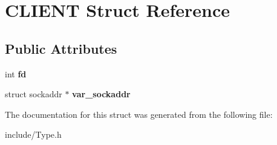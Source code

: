 \hypertarget{structCLIENT}{}\section{C\+L\+I\+E\+N\+T Struct Reference}
\label{structCLIENT}
\subsection*{Public Attributes}
\begin{DoxyCompactItemize}
\item 
\hypertarget{structCLIENT_a4f168b37dad1643f1fb622e3c72a6ec4}{}int {\bfseries fd}\label{structCLIENT_a4f168b37dad1643f1fb622e3c72a6ec4}

\item 
\hypertarget{structCLIENT_ae249309659a68fe4fb81404cf39a39bc}{}struct sockaddr $\ast$ {\bfseries var\+\_\+sockaddr}\label{structCLIENT_ae249309659a68fe4fb81404cf39a39bc}

\end{DoxyCompactItemize}


The documentation for this struct was generated from the following file\+:\begin{DoxyCompactItemize}
\item 
include/Type.\+h\end{DoxyCompactItemize}
